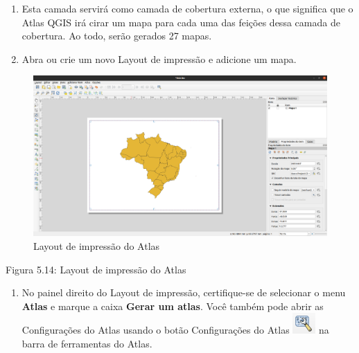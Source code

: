 \documentclass[
  portuguese,
]{krantz}
\providecommand{\tightlist}{%
  \setlength{\itemsep}{0pt}\setlength{\parskip}{0pt}}
\begin{document}
\begin{enumerate}
\def\labelenumi{\arabic{enumi}.}
\item
  Esta camada servirá como camada de cobertura externa, o que significa que o Atlas QGIS irá cirar um mapa para cada uma das feições dessa camada de cobertura. Ao todo, serão gerados 27 mapas.
\item
  Abra ou crie um novo Layout de impressão e adicione um mapa.
\end{enumerate}

\begin{figure}
\centering
\includegraphics{media/modulo5/atlas-print-layout.png}
\caption{Layout de impressão do Atlas}
\end{figure}

Figura 5.14: Layout de impressão do Atlas

\begin{enumerate}
\def\labelenumi{\arabic{enumi}.}
\setcounter{enumi}{2}
\tightlist
\item
  No painel direito do Layout de impressão, certifique-se de selecionar o menu \textbf{Atlas} e marque a caixa \textbf{Gerar um atlas}. Você também pode abrir as Configurações do Atlas usando o botão Configurações do Atlas \includegraphics{media/modulo5/atlas-settings-btn.png} na barra de ferramentas do Atlas.
\end{enumerate}
\end{document}
